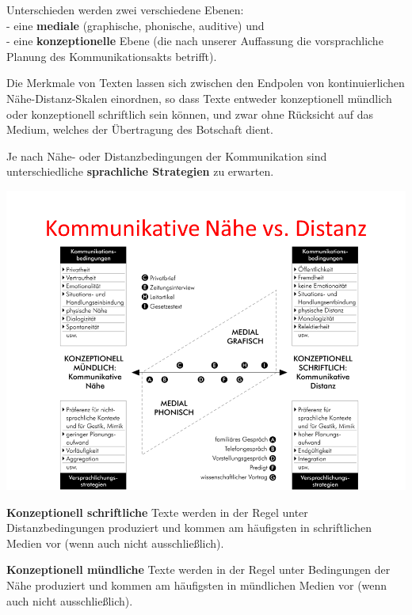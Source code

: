 \documentclass[
  letterpaper,
]{scrbook}
\begin{document}
Unterschieden werden zwei verschiedene Ebenen:\\
- eine \textbf{mediale} (graphische, phonische, auditive) und\\
- eine \textbf{konzeptionelle} Ebene (die nach unserer Auffassung die
vorsprachliche Planung des Kommunikationsakts betrifft).

Die Merkmale von Texten lassen sich zwischen den Endpolen von
kontinuierlichen Nähe-Distanz-Skalen einordnen, so dass Texte entweder
konzeptionell mündlich oder konzeptionell schriftlich sein können, und
zwar ohne Rücksicht auf das Medium, welches der Übertragung des
Botschaft dient.

Je nach Nähe- oder Distanzbedingungen der Kommunikation sind
unterschiedliche \textbf{sprachliche Strategien} zu erwarten.

\includegraphics[width=1\textwidth,height=\textheight]{./pictures/nahe_distanz_diagram3.png}

\textbf{Konzeptionell schriftliche} Texte werden in der Regel unter
Distanzbedingungen produziert und kommen am häufigsten in schriftlichen
Medien vor (wenn auch nicht ausschließlich).

\textbf{Konzeptionell mündliche} Texte werden in der Regel unter
Bedingungen der Nähe produziert und kommen am häufigsten in mündlichen
Medien vor (wenn auch nicht ausschließlich).
\end{document}
